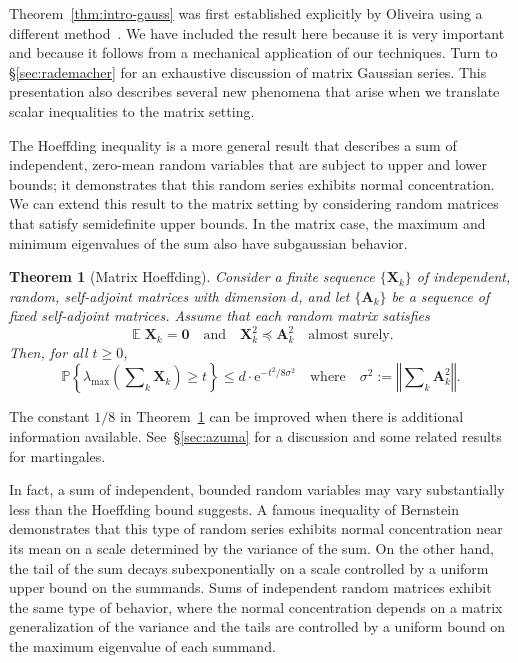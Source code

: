\documentclass[11pt,letterpaper,twoside,reqno,draft]{amsart}
\newtheorem{thm}{Theorem}
\theoremstyle{remark}
\numberwithin{equation}{section}
\numberwithin{thm}{section}
\begin{document}
Theorem~\ref{thm:intro-gauss} was first established explicitly by Oliveira using a different method~\cite{Oli10:Sums-Random}.  We have included the result here because it is very important and because it follows from a mechanical application of our techniques.  Turn to \S\ref{sec:rademacher} for an exhaustive discussion of matrix Gaussian series.  This presentation also describes several new phenomena that arise when we translate scalar inequalities to the matrix setting.

The Hoeffding inequality is a more general result that describes a sum of independent, zero-mean random variables that are subject to upper and lower bounds; it demonstrates that this random series exhibits normal concentration.  We can extend this result to the matrix setting by considering random matrices that satisfy semidefinite upper bounds.  In the matrix case, the maximum and minimum eigenvalues of the sum also have subgaussian behavior.

\begin{thm}[Matrix Hoeffding] \label{thm:intro-hoeffding}
Consider a finite sequence $\{ {\bm{{X}}}_k \}$ of independent, random, self-adjoint matrices with dimension $d$, and let $\{ {\bm{{A}}}_k \}$ be a sequence of fixed self-adjoint matrices.  Assume that each random matrix satisfies
$$
{\operatorname{\mathbb{E}}} {\bm{{X}}}_k = {\bm{{0}}}
\quad\text{and}\quad
{\bm{{X}}}_k^2 {\preccurlyeq} {\bm{{A}}}_k^2
\quad\text{almost surely}.
$$
Then, for all $t \geq 0$,
$$
{\mathbb{P}\left\{ {{ \lambda_{\max}\left( \sum\nolimits_k {\bm{{X}}}_k \right) \geq t }} \right\}}
	\leq d \cdot {\mathrm{e}}^{-t^2 / 8\sigma^2 }
	\quad\text{where}\quad
	\sigma^2 := {\left\Vert {{ \sum\nolimits_k {\bm{{A}}}_k^2 }} \right\Vert}.
$$
\end{thm}

The constant $1/8$ in Theorem~\ref{thm:intro-hoeffding} can be improved when there is additional information available.  See~\S\ref{sec:azuma} for a discussion and some related results for martingales.

In fact, a sum of independent, bounded random variables may vary substantially
less than the Hoeffding bound suggests.  A famous inequality of Bernstein
demonstrates that this type of random series exhibits normal concentration near its mean on a scale determined by the
variance of the sum.  On the other hand, the tail of the sum decays subexponentially on a scale
controlled by a uniform upper bound on the summands. Sums of independent random matrices
exhibit the same type of behavior, where the normal concentration depends on a matrix generalization
of the variance and the tails are controlled by a uniform bound on the maximum eigenvalue of each
summand.
\end{document}
